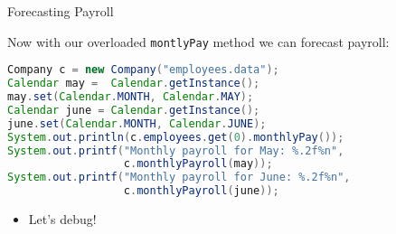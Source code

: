 \documentclass{beamer}
\begin{document}
\begin{frame}[fragile]{Forecasting Payroll}


Now with our overloaded  {\tt montlyPay} method we can forecast payroll:
\begin{lstlisting}[language=Java]
Company c = new Company("employees.data");
Calendar may =  Calendar.getInstance();
may.set(Calendar.MONTH, Calendar.MAY);
Calendar june = Calendar.getInstance();
june.set(Calendar.MONTH, Calendar.JUNE);
System.out.println(c.employees.get(0).monthlyPay());
System.out.printf("Monthly payroll for May: %.2f%n",
                  c.monthlyPayroll(may));
System.out.printf("Monthly payroll for June: %.2f%n",
                  c.monthlyPayroll(june));
\end{lstlisting}

\begin{itemize}
\item Let's debug!
\end{itemize}


\end{frame}








\end{document}
